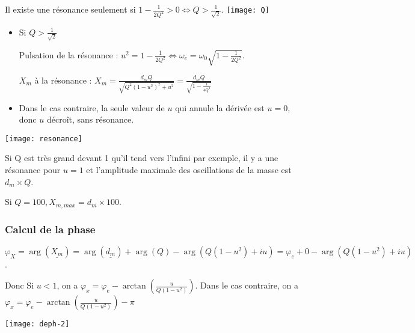\documentclass[french]{yLectureNote}
\begin{document}
Il existe une résonance seulement si $ 1-\frac{1}{2Q^2} >0 \iff Q > \frac{1}{\sqrt{2}}$.
\texttt{[image: Q]}
\begin{itemize}
 \item Si $Q>\frac{1}{\sqrt{2}}$

Pulsation de la résonance : $u^2 = 1-\frac{1}{2Q^2} \iff \omega_e = \omega_0 \sqrt{1-\frac{1}{2Q^2}}$.

$X_m$ à la résonance : $X_m = \frac{d_mQ}{\sqrt{Q^2(1-u^2)^2 + u^2}} = \frac{d_mQ}{\sqrt{1-\frac{1}{4Q^2}}}$
\item Dans le cas contraire, la seule valeur de $u$ qui annule la dérivée est $u=0$, donc $u$ décroît, sans résonance.
\end{itemize}
\texttt{[image: resonance]}

Si Q est très grand devant 1 qu'il tend vers l'infini par exemple, il y a une résonance pour $u = 1$ et l'amplitude maximale des oscillations de la masse est $d_m\times Q$.

Si $Q=100, X_{m,max} = d_m\times 100$.
\subsubsection{Calcul de la phase}
$\varphi_X = \arg(\underline{X_m}) = \arg(\underline{d_m}) + \arg(Q)  - \arg(Q(1-u^2)+iu) = \varphi_e + 0 - \arg(Q(1-u^2)+iu)$.

Donc Si $u<1$, on a $\varphi_x = \varphi_e - \arctan(\frac{u}{Q(1-u^2)})$. Dans le cas contraire, on a $\varphi_x = \varphi_e - \arctan(\frac{u}{Q(1-u^2)}) - \pi$

\texttt{[image: deph-2]}
\end{document}
